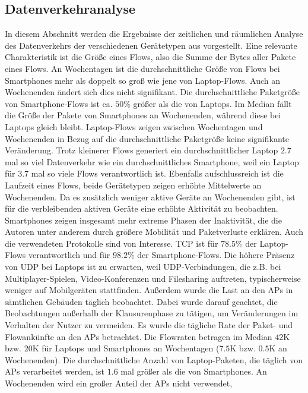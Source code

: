 \documentclass[12pt, a4paper]{article}
\begin{document}
\subsection{Datenverkehranalyse}
\label{sec:phase2_b}

In diesem Abschnitt werden die Ergebnisse der zeitlichen und räumlichen Analyse des Datenverkehrs der verschiedenen Gerätetypen
aus \cite{Alipour2018} vorgestellt. Eine relevante Charakteristik ist die Größe eines Flows, also die Summe der Bytes aller
Pakete eines Flows. An Wochentagen ist die durchschnittliche Größe von Flows bei Smartphones mehr als doppelt so groß wie jene
von Laptop-Flows. Auch an Wochenenden ändert sich dies nicht signifikant. Die durchschnittliche Paketgröße von Smartphone-Flows
ist ca. $50 \%$ größer als die von Laptops. Im Median fällt die Größe der Pakete von Smartphones an Wochenenden, 
während diese bei Laptops gleich bleibt. Laptop-Flows zeigen zwischen Wochentagen und Wochenenden in Bezug auf die 
durchschnittliche Paketgröße keine signifikante Veränderung. Trotz kleinerer Flows generiert ein durchschnittlicher Laptop $2.7$
mal so viel Datenverkehr wie ein durchschnittliches Smartphone, weil ein Laptop für $3.7$ mal so viele Flows verantwortlich ist.
Ebenfalls aufschlussreich ist die Laufzeit eines Flows, beide Gerätetypen zeigen erhöhte Mittelwerte an Wochenenden.
Da es zusätzlich weniger aktive Geräte an Wochenenden gibt, ist für die verbleibenden aktiven Geräte eine erhöhte Aktivität
zu beobachten. Smartphones zeigen insgesamt mehr extreme Phasen der Inaktivität, die die Autoren unter anderem durch größere
Mobilität und Paketverluste erklären.
Auch die verwendeten Protokolle sind von Interesse. TCP ist für $78.5 \%$ der Laptop-Flows verantwortlich
und für $98.2 \%$ der Smartphone-Flows. Die höhere Präsenz von UDP bei Laptops ist zu erwarten, weil
UDP-Verbindungen, die z.B. bei Multiplayer-Spielen, Video-Konferenzen und Filesharing auftreten,
typischerweise weniger auf Mobilgeräten stattfinden. \cite{Alipour2018}
Außerdem wurde die Last an den APs in sämtlichen Gebäuden täglich beobachtet. Dabei wurde darauf geachtet,
die Beobachtungen außerhalb der Klausurenphase zu tätigen, um Veränderungen im Verhalten der Nutzer zu vermeiden.
Es wurde die tägliche Rate der Paket- und Flowankünfte an den APs betrachtet. Die Flowraten betragen im Median
$42$\textsc{K} bzw. $20$\textsc{K} für Laptops und Smartphones an Wochentagen ($7.5$\textsc{K} bzw. $0.5$\textsc{K}
an Wochenenden). Die durchschnittliche Anzahl von Laptop-Paketen, die täglich von APs verarbeitet werden,
ist $1.6$ mal größer als die von Smartphones. An Wochenenden wird ein großer Anteil der APs nicht verwendet,
\end{document}
